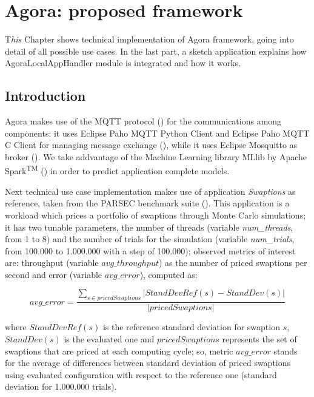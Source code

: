 \chapter{Agora: proposed framework}\label{agora}

\lettrine{T}{}\textit{his} Chapter shows technical implementation of Agora framework, going into detail of all possible use cases. In the last part, a sketch application explains how AgoraLocalAppHandler module is integrated and how it works.


\section{Introduction}

Agora makes use of the MQTT protocol (\cite{banks2014mqtt}) for the communications among components: it uses Eclipse Paho MQTT Python Client and Eclipse Paho MQTT C Client for managing message exchange (\cite{o2014paho}), while it uses Eclipse Mos\-quitto as broker (\cite{light2013mosquitto}). We take addvantage of the Machine Learning library MLlib by Apache Spark\textsuperscript{TM} (\cite{spark2015apache}) in order to predict application complete models.

Next technical use case implementation makes use of application \textit{Swaptions} as reference, taken from the PARSEC benchmark suite (\cite{bienia2008parsec}). This application is a workload which prices a portfolio of swaptions through Monte Carlo simulations; it has two tunable parameters, the number of threads (variable \textit{num\_threads}, from 1 to 8) and the number of trials for the simulation (variable \textit{num\_trials}, from 100.000 to 1.000.000 with a step of 100.000); observed metrics of interest are: throughput (variable $avg\_throughput$) as the number of priced swaptions per second and error (variable $avg\_error$), computed as:

\[
avg\_error = \dfrac{\sum_{s \in pricedSwaptions} \left\vert StandDevRef(s) - StandDev(s) \right\vert}{\left\vert pricedSwaptions \right\vert}
\]

where $StandDevRef(s)$ is the reference standard deviation for swaption $s$, $StandDev(s)$ is the evaluated one and $pricedSwaptions$ represents the set of swaptions that are priced at each computing cycle; so, metric $avg\_error$ stands for the average of differences between standard deviation of priced swaptions using evaluated configuration with respect to the reference one (standard deviation for 1.000.000 trials).

